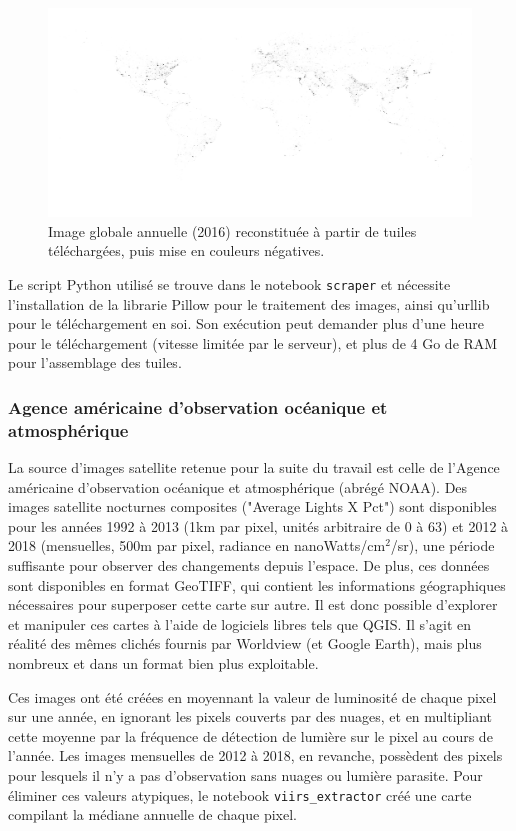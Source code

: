 \documentclass[a4paper, 11pt]{report}
\begin{document}
\begin{figure}
	\centering
	\includegraphics[width=0.8\paperheight, angle=-90, origin=c]{img/tiles_2016_zoom6.png}
	\caption{Image globale annuelle (2016) reconstituée à partir de tuiles téléchargées, puis mise en couleurs négatives.}
	\label{nasa-worldview-tiles}
\end{figure}

Le script Python utilisé se trouve dans le notebook \texttt{scraper} et nécessite l'installation de la librarie Pillow pour le traitement des images, ainsi qu'urllib pour le téléchargement en soi. Son exécution peut demander plus d'une heure pour le téléchargement (vitesse limitée par le serveur), et plus de 4 Go de RAM pour l'assemblage des tuiles.

\subsubsection{Agence américaine d'observation océanique et atmosphérique}
La source d'images satellite retenue pour la suite du travail est celle de l'Agence américaine d'observation océanique et atmosphérique (abrégé NOAA). Des images satellite nocturnes composites ("Average Lights X Pct") sont disponibles pour les années 1992 à 2013 \cite{noaa} (1km par pixel, unités arbitraire de 0 à 63) et 2012 à 2018 \cite{noaa-viirs} (mensuelles, 500m par pixel, radiance en nanoWatts/cm$^2$/sr), une période suffisante pour observer des changements depuis l'espace. De plus, ces données sont disponibles en format GeoTIFF, qui contient les informations géographiques nécessaires pour superposer cette carte sur autre. Il est donc possible d'explorer et manipuler ces cartes à l'aide de logiciels libres tels que QGIS. Il s'agit en réalité des mêmes clichés fournis par Worldview (et Google Earth), mais plus nombreux et dans un format bien plus exploitable.

Ces images ont été créées en moyennant la valeur de luminosité de chaque pixel sur une année, en ignorant les pixels couverts par des nuages, et en multipliant cette moyenne par la fréquence de détection de lumière sur le pixel au cours de l'année. Les images mensuelles de 2012 à 2018, en revanche, possèdent des pixels pour lesquels il n'y a pas d'observation sans nuages ou lumière parasite. Pour éliminer ces valeurs atypiques, le notebook \texttt{viirs\_extractor} créé une carte compilant la médiane annuelle de chaque pixel.
\end{document}
